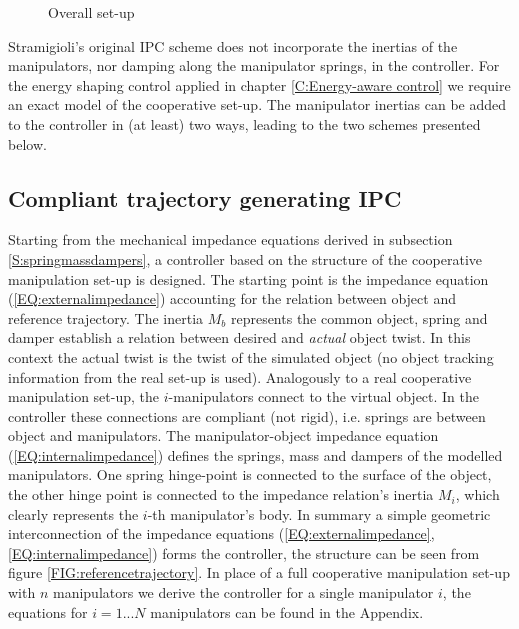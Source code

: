 \documentclass[a4paper,twoside, openright,12pt]{report}
\begin{document}
{\begin{figure}[b]
	\centering
	\small
	\def\svgwidth{0.99\columnwidth}
	
	\caption{Overall set-up}
	\label{FIG:modelbasedcontrol}
\end{figure}
Stramigioli's original IPC scheme \cite{Stramigioli_01} does not incorporate the inertias of the manipulators, nor damping along the manipulator springs, in the controller. For the energy shaping control applied in chapter \ref{C:Energy-aware control} we require an exact model of the cooperative set-up. The manipulator inertias can be added to the controller in (at least) two ways, leading to the two schemes presented below.   

\subsection{Compliant trajectory generating IPC}\label{SS:referencetrajectoryDIPC}
Starting from the mechanical impedance equations derived in subsection \ref{S:springmassdampers}, a controller based on the structure of the cooperative manipulation set-up is designed. The starting point is the impedance equation (\ref{EQ:externalimpedance}) accounting for the relation between object and reference trajectory. The inertia $M_b$ represents the common object, spring and damper establish a relation between desired and \emph{actual} object twist. In this context the actual twist is the twist of the simulated object (no object tracking information from the real set-up is used). Analogously to a real cooperative manipulation set-up, the $i$-manipulators connect to the virtual object. In the controller these connections are compliant (not rigid), i.e. springs are between object and manipulators. The manipulator-object impedance equation (\ref{EQ:internalimpedance}) defines the springs, mass and dampers of the modelled manipulators. One spring hinge-point is connected to the surface of the object, the other hinge point is connected to the impedance relation's inertia  $M_i$, which clearly represents the $i$-th manipulator's body. In summary a simple geometric interconnection of the impedance equations (\ref{EQ:externalimpedance},\ref{EQ:internalimpedance}) forms the controller, the structure can be seen from figure \ref{FIG:referencetrajectory}. In place of a full cooperative manipulation set-up with $n$ manipulators we derive the controller for a single manipulator $i$, the equations for $i=1...N$ manipulators can be found in the Appendix.
\begin{figure}[b]

\end{figure}}
\end{document}
